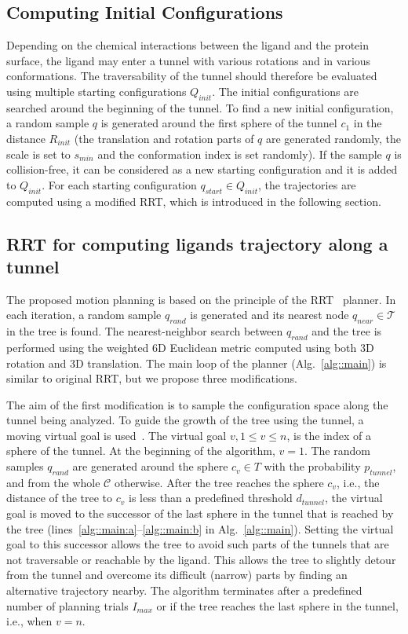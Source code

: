 \documentclass[usletter, 10pt, conference]{ieeeconf} %
\def\qrand{q_{rand}}
\def\qstart{q_{start}}
\def\qinit{\qstart}
\def\qgoal{q_{goal}}
\def\qnear{q_{near}}
\def\T{\mathcal{T}}
\def\C{\mathcal{C}}
\def\dt{d_{tunnel}}
\def\QI{Q_{init}}
\def\RI{R_{init}}
\def\Imax{I_{max}} %
\def\smin{s_{min}}
\def\gb{p_{tunnel}}
\begin{document}
\subsection{Computing Initial Configurations}

Depending on the chemical interactions between the ligand and the protein surface, the ligand may enter a tunnel with various rotations and in various conformations.
The traversability of the tunnel should therefore be evaluated using multiple starting configurations $\QI$.
The initial configurations are searched around the beginning of the tunnel.
To find a new initial configuration, a random sample $q$ is generated around the first sphere of the tunnel 
$c_1$ in the distance $\RI$ (the translation and rotation  parts of $q$ are generated randomly, the scale is set to $\smin$ and the conformation index is set randomly).
If the sample $q$ is collision-free, it can be considered as a new starting configuration and it is added to $\QI$.
For each starting configuration $\qinit \in \QI$, the trajectories are computed using a modified RRT, which is introduced in the following section.


\subsection{RRT for computing ligands trajectory along a tunnel}

The proposed motion planning is based on the principle of the RRT~\cite{lavalleRRT} planner.
In each iteration, a random sample $\qrand$ is generated and its nearest node $\qnear\in\T$ in the tree is found.
The nearest-neighbor search between $\qrand$ and the tree is performed using the weighted 6D Euclidean metric computed using
both 3D rotation and 3D translation.
The main loop of the planner (Alg.~\ref{alg::main}) is similar to original RRT, but we propose three modifications.


The aim of the first modification is to sample the configuration space along the tunnel being analyzed.
To guide the growth of the tree using the tunnel, a moving virtual goal is used~\cite{vonasek2009rrt}.
The virtual goal $v, 1\le v \le n$, is the index of a sphere of the tunnel.
At the beginning of the algorithm, $v=1$.
The random samples $\qrand$ are generated around the sphere $c_v \in T$ with the probability $\gb$, and from the whole $\C$ otherwise.
After the tree reaches the sphere $c_v$, i.e., the distance of the tree to $c_v$ is
less than a predefined threshold $\dt$, the virtual goal is moved to the successor of the last sphere in the tunnel
that is reached by the tree (lines~\ref{alg::main:a}--\ref{alg::main:b} in Alg.~\ref{alg::main}).
Setting the virtual goal to this successor allows the tree to avoid such parts of the tunnels that are not traversable or reachable by the ligand.
This allows the tree to slightly detour from the tunnel and overcome its difficult (narrow) parts by finding an alternative trajectory nearby.
The algorithm terminates after a predefined number of planning trials $\Imax$ or if the tree reaches
the last sphere in the tunnel, i.e., when $v = n$.
\end{document}
